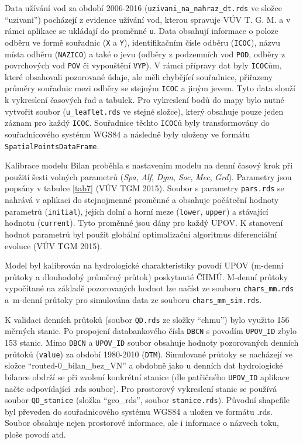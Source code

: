 \documentclass[12pt,]{article}
\begin{document}
\qquad Data užívání vod za období 2006-2016
(\texttt{uzivani\_na\_nahraz\_dt.rds} ve složce \enquote{uzivani})
pocházejí z evidence užívání vod, kterou spravuje VÚV T. G. M. a v rámci
aplikace se ukládají do proměnné \texttt{u}. Data obsahují informace o
poloze odběru ve formě souřadnic (\texttt{X} a \texttt{Y}),
identifikačním čísle odběru (\texttt{ICOC}), názvu místa odběru
(\texttt{NAZICO}) a také o jevu (odběry z podzemních vod \texttt{POD},
odběry z povrchových vod \texttt{POV} či vypouštění \texttt{VYP}). V
rámci přípravy dat byly \texttt{ICOC}ům, které obsahovali pozorované
údaje, ale měli chybějící souřadnice, přiřazeny průměry souřadnic mezi
odběry se stejným \texttt{ICOC} a jiným jevem. Tyto data slouží k
vykreslení časových řad a tabulek. Pro vykreslení bodů do mapy bylo
nutné vytvořit soubor (\texttt{u\_leaflet.rds} ve stejné složce), který
obsahuje pouze jeden záznam pro každý \texttt{ICOC}. Souřadnice těchto
\texttt{ICOC}ů byly transformovány do souřadnicového systému WGS84 a
následně byly uloženy ve formátu \texttt{SpatialPointsDataFrame}.

\qquad Kalibrace modelu Bilan proběhla s nastavením modelu na denní
časový krok při použití šesti volných parametrů (\emph{Spa}, \emph{Alf},
\emph{Dgm}, \emph{Soc}, \emph{Mec}, \emph{Grd}). Parametry jsou popsány
v tabulce \ref{tab7} (VÚV TGM 2015). Soubor s parametry
\texttt{pars.rds} se nahrává v aplikaci do stejnojmenné proměnné a
obsahuje počáteční hodnoty parametrů (\texttt{initial}), jejích dolní a
horní meze (\texttt{lower}, \texttt{upper}) a stávající hodnotu
(\texttt{current}). Tyto proměnné jsou dány pro každý UPOV. K stanovení
hodnot parametrů byl použit globální optimalizační algoritmus
diferenciální evoluce (VÚV TGM 2015).

\qquad Model byl kalibrován na hydrologické charakteristiky povodí UPOV
(m-denní průtoky a dlouhodobý průměrný průtok) poskytnuté ČHMÚ. M-denní
průtoky vypočítané na základě pozorovaných hodnot lze načíst ze souboru
\texttt{chars\_mm.rds} a~m-denní průtoky pro simulována data ze souboru
\texttt{chars\_mm\_sim.rds}.

\qquad K validaci denních průtoků (soubor \texttt{QD.rds} ze složky
\enquote{chmu}) bylo využito 156 měrných stanic. Po propojení
databankového čísla \texttt{DBCN} s povodím \texttt{UPOV\_ID} zbylo 153
stanic. Mimo \texttt{DBCN} a \texttt{UPOV\_ID} soubor obsahuje hodnoty
pozorovaných denních průtoků (\texttt{value}) za období 1980-2010
(\texttt{DTM}). Simulované průtoky se nacházejí ve složce
\enquote{routed-0\_bilan\_bez\_VN} a obdobně jako u denních dat
hydrologické bilance obdrží se při zvolení konkrétní stanice (dle
patřičného \texttt{UPOV\_ID} aplikace načte odpovídající .rds soubor).
Pro prostorový vykreslení stanic se používá soubor \texttt{QD\_stanice}
(složka \enquote{geo\_rds}, soubor \texttt{stanice.rds}). Původní
shapefile byl převeden do souřadnicového systému WGS84 a uložen ve
formátu .rds. Soubor obsahuje nejen prostorové informace, ale i
informace o názvech toku, ploše povodí atd.
\end{document}
